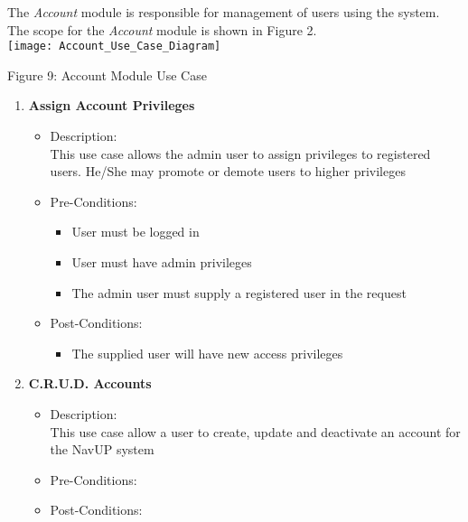 The \textit{Account} module is responsible for management of users using the system. The scope for the \textit{Account} module is shown in Figure 2.  \\[1cm]

\texttt{[image: Account\_Use\_Case\_Diagram]}
\begin{center}
	Figure 9: Account Module Use Case
\end{center}


\begin{enumerate}
	\item \textbf{Assign Account Privileges}
	\begin{itemize}
		\item Description: \\
		This use case allows the admin user to assign privileges to registered users. He/She may promote or demote users to higher privileges 
		\item Pre-Conditions: \\
		\begin{itemize}
		\item User must be logged in
		\item User must have admin privileges
		\item The admin user must supply a registered user in the request
		
		\end{itemize}
		\item Post-Conditions: \\
		
		\begin{itemize}
		\item The supplied user will have new access privileges 
		
		\end{itemize}
	
	\end{itemize}
	
	\item \textbf{C.R.U.D. Accounts}
	\begin{itemize}
		\item Description: \\
		This use case allow a user to create, update and deactivate an account for the NavUP system
		\item Pre-Conditions: \\
		
		\item Post-Conditions: \\
	

\end{itemize}
\end{enumerate}
